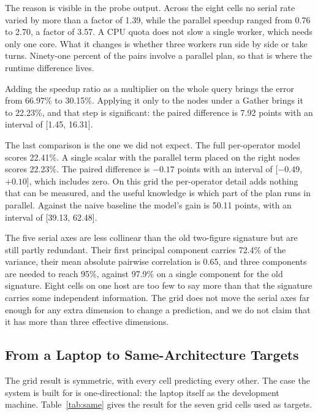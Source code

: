 \documentclass[runningheads]{llncs}
\begin{document}
The reason is visible in the probe output. Across the eight cells no serial
rate varied by more than a factor of 1.39, while the parallel speedup ranged
from 0.76 to 2.70, a factor of 3.57. A CPU quota does not slow a single
worker, which needs only one core. What it changes is whether three workers
run side by side or take turns. Ninety-one percent of the pairs involve a
parallel plan, so that is where the runtime difference lives.

Adding the speedup ratio as a multiplier on the whole query brings the error
from 66.97\% to 30.15\%. Applying it only to the nodes under a Gather brings
it to 22.23\%, and that step is significant: the paired difference is 7.92
points with an interval of [1.45, 16.31].

The last comparison is the one we did not expect. The full per-operator model
scores 22.41\%. A single scalar with the parallel term placed on the right
nodes scores 22.23\%. The paired difference is $-0.17$ points with an
interval of [$-0.49$, $+0.10$], which includes zero. On this grid the
per-operator detail adds nothing that can be measured, and the useful
knowledge is which part of the plan runs in parallel. Against the naive
baseline the model's gain is 50.11 points, with an interval of [39.13,
62.48].

The five serial axes are less collinear than the old two-figure signature
but are still partly redundant. Their first principal component carries
72.4\% of the variance, their mean absolute pairwise correlation is 0.65, and
three components are needed to reach 95\%, against 97.9\% on a single
component for the old signature. Eight cells on one host are too few to say
more than that the signature carries some independent information. The grid
does not move the serial axes far enough for any extra dimension to change a
prediction, and we do not claim that it has more than three effective
dimensions.

\subsection{From a Laptop to Same-Architecture Targets}

The grid result is symmetric, with every cell predicting every other. The
case the system is built for is one-directional: the laptop itself as the
development machine. Table~\ref{tab:same} gives the result for the seven grid
cells used as targets.
\end{document}
